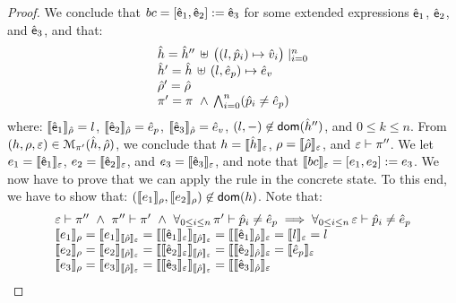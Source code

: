 \begin{proof}
\noindent{}
We conclude that  $\bcmd = [\pvsexpr_1, \pvsexpr_2] := \pvsexpr_3$ for some extended expressions $\pvsexpr_1$, $\pvsexpr_2$, 
and $\pvsexpr_3$, and that: 
$$
\begin{array}{l}
  \sheap =   \sheap'' \, \uplus \, \big((l, \sexprp_i) \mapsto \sexprv_i\big)\mid_{i = 0}^n     \\
  \sheap' =  \sheap \, \uplus \,  (l, \sexpr_p) \mapsto \sexpr_v  \\
  \sstore' = \sstore \\ 
    \pc' = \pc \ \wedge \, \bigwedge_{i = 0}^n (\sexprp_i \neq \sexpr_p)
\end{array}
$$ 
where: $\symbeval{\pvsexpr_1}{\sstore} =  \loc$, $\symbeval{\pvsexpr_2}{\sstore} =  \sexpr_p$, 
$\symbeval{\pvsexpr_3}{\sstore} =  \sexpr_v$,  $(\loc, -) \not\in \domain(\sheap'')$, 
and $0 \leq k \leq n$. 
From $(\heap, \store, \senv) \in \smodels{\sheap, \sstore}{\pc'}$, we conclude that $\heap = \semexpr{\sheap}{\senv}$, $\store = \semexpr{\sstore}{\senv}$, and 
$\senv \vdash \pc''$. 
We let $\jsilexpr_1 = \symbeval{\pvsexpr_1}{\senv}$, 
$\jsilexpr_2 = \symbeval{\pvsexpr_2}{\senv}$, and $\jsilexpr_3 = \symbeval{\pvsexpr_3}{\senv}$, and note that $\symbeval{\bcmd}{\senv} = [\jsilexpr_1, \jsilexpr_2] := \jsilexpr_3$.
We now have to prove that we can apply the  rule in the concrete state.
To this end, we have to show that:
$(\symbeval{\jsilexpr_1}{\store}, \symbeval{\jsilexpr_2}{\store}) \not\in \domain(\heap)$. 
Note that: 
$$
\begin{array}{l}
%
\senv \vdash \pc'' \ \wedge \ \pc'' \vdash \pc' \ \wedge \ \forall_{0 \leq i \leq n}  \, \pc' \vdash \sexprp_i \neq \sexpr_p  
      \implies \forall_{0 \leq i \leq n}  \, \senv \vdash \sexprp_i \neq \sexpr_p  \\
%
 \symbeval{\jsilexpr_1}{\store} = \symbeval{\jsilexpr_1}{\symbeval{\sstore}{\senv}} = \symbeval{\symbeval{\pvsexpr_1}{\senv}}{\symbeval{\sstore}{\senv}} = \symbeval{\symbeval{\pvsexpr_1}{\sstore}}{\senv} 
    = \symbeval{\loc}{\senv} = \loc \\ 
  \symbeval{\jsilexpr_2}{\store}  = \symbeval{\jsilexpr_2}{\semexpr{\sstore}{\senv}} =  \symbeval{\symbeval{\pvsexpr_2}{\senv}}{\symbeval{\sstore}{\senv}} = \symbeval{\symbeval{\pvsexpr_2}{\sstore}}{\senv}
   =  \symbeval{\sexpr_p}{\senv} \\
  \symbeval{\jsilexpr_3}{\store}  = \symbeval{\jsilexpr_3}{\semexpr{\sstore}{\senv}} =  \symbeval{\symbeval{\pvsexpr_3}{\senv}}{\symbeval{\sstore}{\senv}} = \symbeval{\symbeval{\pvsexpr_3}{\sstore}}{\senv}

\end{array}$$
\end{proof}
